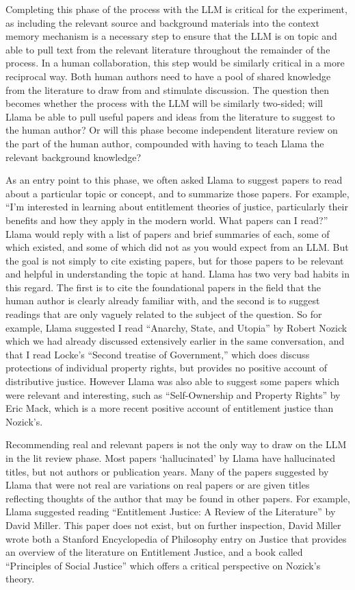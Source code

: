 Completing this phase of the process with the LLM is critical for the
experiment, as including the relevant source and background materials into the
context memory mechanism is a necessary step to ensure that the LLM is on topic
and able to pull text from the relevant literature throughout the remainder of
the process. In a human collaboration, this step would be similarly critical in
a more reciprocal way. Both human authors need to have a pool of shared
knowledge from the literature to draw from and stimulate discussion. The
question then becomes whether the process with the LLM will be similarly
two-sided; will Llama be able to pull useful papers and ideas from the
literature to suggest to the human author? Or will this phase become independent
literature review on the part of the human author, compounded with having to
teach Llama the relevant background knowledge?

As an entry point to this phase, we often asked Llama to suggest papers to read
about a particular topic or concept, and to summarize those papers. For example,
``I'm interested in learning about entitlement theories of justice, particularly
their benefits and how they apply in the modern world. What papers can I read?''
Llama would reply with a list of papers and brief summaries of each, some of
which existed, and some of which did not as you would expect from an LLM. But 
the goal is not simply to cite existing papers, but for those papers to be
relevant and helpful in understanding the topic at hand. Llama has two very bad
habits in this regard. The first is to cite the foundational papers in the field
that the human author is clearly already familiar with, and the second is to 
suggest readings that are only vaguely related to the subject of the question.
So for example, Llama suggested I read ``Anarchy, State, and Utopia'' by Robert
Nozick which we had already discussed extensively earlier in the same
conversation, and that I read Locke's ``Second treatise of Government,'' which 
does discuss protections of individual property rights, but provides no positive
account of distributive justice. However Llama was also able to suggest some
papers which were relevant and interesting, such as ``Self-Ownership and
Property Rights'' by Eric Mack, which is a more recent positive account of
entitlement justice than Nozick's. 

Recommending real and relevant papers is not the only way to draw on the LLM in
the lit review phase. Most papers `hallucinated' by Llama have hallucinated 
titles, but not authors or publication years. Many of the papers suggested by
Llama that were not real are variations on real papers or are given titles
reflecting thoughts of the author that may be found in other papers. For example,
Llama suggested reading ``Entitlement Justice: A Review of the Literature'' by 
David Miller. This paper does not exist, but on further inspection, David Miller
wrote both a Stanford Encyclopedia of Philosophy entry on Justice that provides
an overview of the literature on Entitlement Justice, and a book called
``Principles of Social Justice'' which offers a critical perspective on Nozick's
theory.

